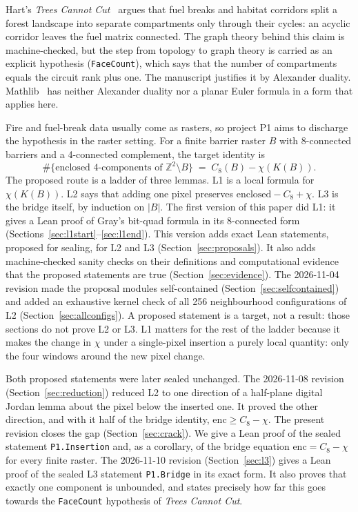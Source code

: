 \documentclass[11pt]{article}
\theoremstyle{definition}
\theoremstyle{remark}
\begin{document}
Hart's \emph{Trees Cannot Cut}~\cite{Hart2026} argues that fuel breaks and
habitat corridors split a forest landscape into separate compartments only
through their cycles: an acyclic corridor leaves the fuel matrix connected. The
graph theory behind this claim is machine-checked, but the step from topology to
graph theory is carried as an explicit hypothesis (\texttt{FaceCount}), which
says that the number of compartments equals the circuit rank plus one. The
manuscript justifies it by Alexander duality. Mathlib~\cite{Mathlib2020} has
neither Alexander duality nor a planar Euler formula in a form that applies
here.

Fire and fuel-break data usually come as rasters, so project P1 aims to
discharge the hypothesis in the raster setting. For a finite barrier raster $B$
with 8-connected barriers and a 4-connected complement, the target identity is
\[
  \#\{\text{enclosed 4-components of } \mathbb{Z}^2\setminus B\}
  \;=\; C_8(B) - \chi(K(B)).
\]
The proposed route is a ladder of three lemmas. L1 is a local formula for
$\chi(K(B))$. L2 says that adding one pixel preserves
$\text{enclosed} - C_8 + \chi$. L3 is the bridge itself, by induction on $|B|$.
The first version of this paper did L1: it gives a Lean proof of Gray's
bit-quad formula in its 8-connected form (Sections~\ref{sec:l1start}--\ref{sec:l1end}).
This version adds exact Lean statements, proposed for sealing, for L2 and L3
(Section~\ref{sec:proposals}). It also adds machine-checked sanity checks on
their definitions and computational evidence that the proposed statements are
true (Section~\ref{sec:evidence}). The 2026-11-04 revision made the proposal
modules self-contained (Section~\ref{sec:selfcontained}) and added an exhaustive
kernel check of all 256 neighbourhood configurations of L2
(Section~\ref{sec:allconfigs}). A proposed statement is a target, not a
result: those sections do not prove L2 or L3. L1 matters for the rest of the ladder because it makes the
change in $\chi$ under a single-pixel insertion a purely local quantity: only
the four windows around the new pixel change.

Both proposed statements were later sealed unchanged. The 2026-11-08 revision
(Section~\ref{sec:reduction}) reduced L2 to one direction of a half-plane digital
Jordan lemma about the pixel below the inserted one. It proved the other direction,
and with it half of the bridge identity, $\mathrm{enc}\ge C_8-\chi$. The present
revision closes the gap (Section~\ref{sec:crack}). We give a Lean proof of
the sealed statement \texttt{P1.Insertion} and, as a corollary, of the bridge
equation $\mathrm{enc}=C_8-\chi$ for every finite raster. The 2026-11-10 revision
(Section~\ref{sec:l3}) gives a Lean proof of the sealed L3 statement \texttt{P1.Bridge}
in its exact form. It also proves that exactly one component is unbounded, and states
precisely how far this goes towards the \texttt{FaceCount} hypothesis of
\emph{Trees Cannot Cut}.
\end{document}
